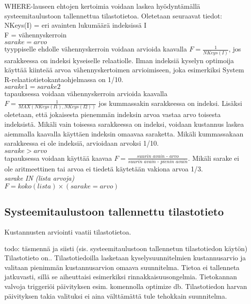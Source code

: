 \documentclass[finnish]{tktltiki2}
\theoremstyle{definition}
\theoremstyle{remark}
\begin{document}
WHERE-lauseen ehtojen kertoimia voidaan laskea hyödyntämällä systeemitaulustoon tallennettua tilastotietoa. Oletetaan seuraavat tiedot: %
\\\newline
NKeys(I) = eri avainten lukumäärä indeksissä I
\\
F = vähennyskerroin
\\\newline
$sarake = arvo$ 
\\
tyyppiselle ehdolle vähennyskerroin voidaan arvioida kaavalla $F = \frac{1}{NKeys(I)}$, jos sarakkeessa on indeksi kyseiselle relaatiolle. \cite{selinger1979access} Ilman indeksiä kyselyn optimoija käyttää kiinteää arvoa vähennyskertoimen arvioimiseen, joka esimerkiksi System R-relaatiotietokantaohjelmassa \cite{astrahan1976system} on 1/10.
\\\newline
$sarake1 = sarake2$ 
\\
tapauksessa voidaan vähennyskerroin arvioida kaavalla $F = \frac{1}{MAX (NKeys(I1), NKeys(I2))}$ jos kummassakin sarakkeessa on indeksi. Lisäksi oletetaan, että jokaisesta pienemmän indeksin arvoa vastaa arvo toisesta indeksistä. Mikäli vain toisessa sarakkeessa on indeksi, 
voidaan kustannus laskea aiemmalla kaavalla käyttäen indeksin omaavaa saraketta. Mikäli kummassakaan sarakkeessa ei ole indeksiä, arvioidaan arvoksi 1/10.
\\\newline
$sarake > arvo$
\\
tapauksessa voidaan käyttää kaavaa $F = \frac{\textit{suurin avain - arvo}}{\textit{suurin avain - pienin avain}}$. Mikäli sarake ei ole aritmeettinen tai arvoa ei tiedetä käytetään vakiona arvoa 1/3.
\\\newline
\textit{sarake IN (lista arvoja)}
\\
$F = koko(lista) \times (sarake = arvo)$

\subsection{Systeemitaulustoon tallennettu tilastotieto}
Kustannusten arviointi vaatii tilastotietoa. \cite{ramakrishnan2003database}

todo: täsmennä ja siisti
(sis. systeemitaulustoon tallennetun tilastotiedon käytön)
Tilastotieto on..
Tilastotiedoilla lasketaan kyselysuunnitelmien kustannusarvio ja valitaan pienimmän kustannusarvion omaava suunnitelma.
Tietoa ei tallenneta jatkuvasti, sillä se aiheuttaisi esimerkiksi rinnakkaisuusongelmia. Tietokannan valvoja 
triggeriöi päivityksen esim. komennolla optimize db. Tilastotiedon harvan päivityksen takia valituksi ei aina välttämättä tule 
tehokkain suunnitelma.
\end{document}
